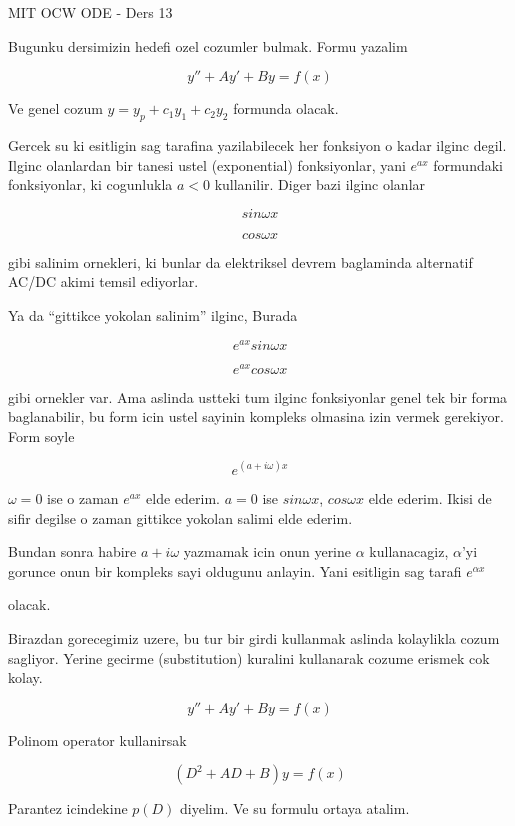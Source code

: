 \documentclass[12pt,fleqn]{article}
\begin{document}
MIT OCW ODE - Ders 13

Bugunku dersimizin hedefi ozel cozumler bulmak. Formu yazalim

\[ y'' + Ay' + By = f(x) \]

Ve genel cozum $y = y_p + c_1y_1 + c_2y_2$ formunda olacak. 

Gercek su ki esitligin sag tarafina yazilabilecek her fonksiyon o kadar
ilginc degil. Ilginc olanlardan bir tanesi ustel (exponential)
fonksiyonlar, yani $e^{ax}$ formundaki fonksiyonlar, ki cogunlukla $a<0$
kullanilir. Diger bazi ilginc olanlar 

\[ sin \omega x \]

\[ cos \omega x \]

gibi salinim
ornekleri, ki bunlar da elektriksel devrem baglaminda alternatif AC/DC
akimi temsil ediyorlar.

Ya da ``gittikce yokolan salinim'' ilginc, Burada 

\[ e^{ax}sin \omega x \]

\[ e^{ax}cos \omega x \]

gibi ornekler var. Ama aslinda ustteki tum ilginc fonksiyonlar genel tek
bir forma baglanabilir, bu form icin ustel sayinin kompleks olmasina izin
vermek gerekiyor. Form soyle

\[ e^{(a+i\omega)x} \]

$\omega = 0$ ise o zaman $e^{ax}$ elde ederim. $a=0$ ise $sin\omega x$,
$cos\omega x$ elde ederim. Ikisi de sifir degilse o zaman gittikce yokolan
salimi elde ederim. 

Bundan sonra habire $a+i\omega$ yazmamak icin onun yerine $\alpha$
kullanacagiz, $\alpha$'yi gorunce onun bir kompleks sayi oldugunu
anlayin. Yani esitligin sag tarafi $e^{\alpha x}$











 olacak. 

Birazdan gorecegimiz uzere, bu tur bir girdi kullanmak aslinda kolaylikla
cozum sagliyor. Yerine gecirme (substitution) kuralini kullanarak cozume
erismek cok kolay. 

\[ y'' + Ay' + By = f(x) \]

Polinom operator kullanirsak

\[ (D^2 + AD + B )y = f(x) \]

Parantez icindekine $p(D)$ diyelim. Ve su formulu ortaya atalim. 
\end{document}
